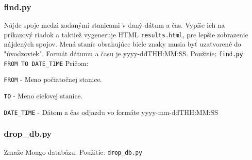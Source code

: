 \documentclass[10pt,xcolor=pdflatex,dvipsnames,table,oneside]{book}
\begin{document}
\subsubsection*{find.py}
\par Nájde spoje medzi zadanými stanicami v daný dátum a čas. Vypíše ich na príkazový riadok a taktiež vygeneruje HTML \verb|results.html|, pre lepšie zobrazenie nájdených spojov. Mená staníc obsahujúce biele znaky musia byť uzatvorené do "úvodzoviek". Formát dátumu a času je yyyy-ddTHH:MM:SS. \newline \newline
Použitie: \verb|find.py FROM TO DATE_TIME|
\newline \newline
Pričom:
\newline
\par \verb|FROM| - Meno počiatočnej stanice.
\newline
\par \verb|TO| - Meno cieľovej stanice.
\newline
\par \verb|DATE_TIME| - Dátom a čas odjazdu vo formáte yyyy-mm-ddTHH:MM:SS
\newline

\subsubsection*{drop\_db.py}
\par Zmaže Mongo databázu.
\newline \newline
Použitie: \verb|drop_db.py|









\end{document}
